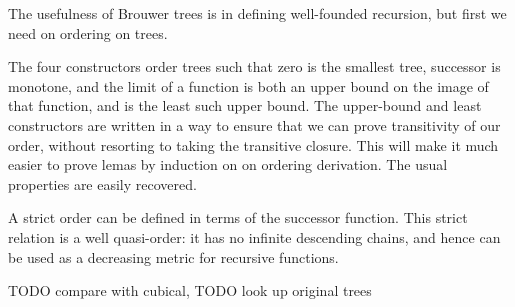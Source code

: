 




The usefulness of Brouwer trees is in defining well-founded recursion, but first we need on ordering on trees.

The four constructors order trees such that zero is the smallest tree, successor is monotone, and the limit of a function is both an upper bound on the image of that function, and is the least such upper bound.
The upper-bound and least constructors are written in a way to ensure that we can prove transitivity of our order, without resorting to taking the transitive closure. This will make it much easier to prove lemas by induction on on ordering derivation. The usual properties are easily recovered.

A strict order can be defined in terms of the successor function. This strict relation is a well quasi-order: it has no infinite descending chains, and hence
can be used as a decreasing metric
for recursive functions.

    TODO compare with cubical,
    TODO look up original trees

